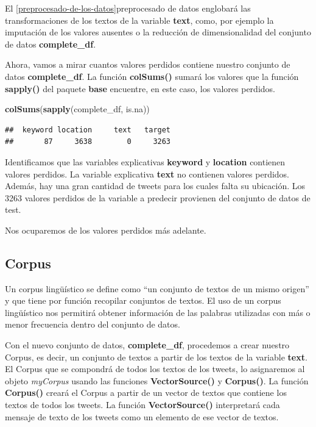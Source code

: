 \documentclass[]{article}
\newenvironment{Shaded}{\begin{snugshade}}{\end{snugshade}}
\newcommand{\KeywordTok}[1]{\textcolor[rgb]{0.13,0.29,0.53}{\textbf{#1}}}
\newcommand{\NormalTok}[1]{#1}
\begin{document}
El \ref{preprocesado-de-los-datos}{preprocesado de datos} englobará las transformaciones de los textos de la variable \textbf{text}, como, por ejemplo la imputación de los valores ausentes o la reducción de
dimensionalidad del conjunto de datos \textbf{complete\_df}.

Ahora, vamos a mirar cuantos valores perdidos contiene nuestro conjunto de
datos \textbf{complete\_df}. La función \textbf{colSums()} sumará los
valores que la función \textbf{sapply()} del paquete \textbf{base} encuentre, en este caso, los
valores perdidos.

\vspace{3mm}

\begin{Shaded}
\begin{Highlighting}[]
\KeywordTok{colSums}\NormalTok{(}\KeywordTok{sapply}\NormalTok{(complete_df, is.na))}
\end{Highlighting}
\end{Shaded}

\begin{verbatim}
##  keyword location     text   target 
##       87     3638        0     3263
\end{verbatim}

Identificamos que las variables explicativas \textbf{keyword} y
\textbf{location} contienen valores perdidos. La variable explicativa
\textbf{text} no contienen valores perdidos. Además, hay una gran cantidad
de tweets para los cuales falta su ubicación. Los 3263 valores perdidos
de la variable a predecir provienen del conjunto de datos de test. 

Nos ocuparemos de los valores perdidos más adelante.

\hypertarget{corpus}{%
\subsection{Corpus}\label{corpus}}

\begin{tcolorbox}
	Un corpus lingüístico se define como ``un conjunto de textos de un
	mismo origen'' y que tiene por función recopilar conjuntos de textos.
	El uso de un corpus lingüístico nos permitirá obtener información de las
	palabras utilizadas con más o menor frecuencia dentro del conjunto de datos.
\end{tcolorbox}

Con el nuevo conjunto de datos, \textbf{complete\_df},
procedemos a crear nuestro Corpus, es decir, un conjunto de textos a partir de los textos de la
variable \textbf{text}. El Corpus que se
compondrá de todos los textos de los tweets, lo asignaremos al objeto
\emph{myCorpus} usando las funciones \textbf{VectorSource()} y
\textbf{Corpus()}. La función \textbf{Corpus()} creará el Corpus a partir de un vector de textos que contiene los textos de todos los tweets. La función \textbf{VectorSource()} interpretará cada
mensaje de texto de los tweets como un elemento de ese vector de textos.
\end{document}

